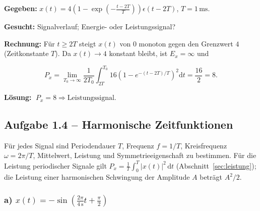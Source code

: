 \begin{beispiel}

\textbf{Gegeben:} $x(t) = 4\left(1 - \exp\!\left(-\frac{t-2T}{T}\right)\right)
\epsilon(t-2T)$, $T = 1\,\mathrm{ms}$.

\textbf{Gesucht:} Signalverlauf; Energie- oder Leistungssignal?

\textbf{Rechnung:} Für $t \geq 2T$ steigt $x(t)$ von $0$ monoton gegen den
Grenzwert $4$ (Zeitkonstante $T$). Da $x(t) \to 4$ konstant bleibt, ist
$E_x = \infty$ und

$$
P_x = \lim_{T_0 \to \infty} \frac{1}{2T_0}\int_{2T}^{T_0}
      16\left(1 - e^{-(t-2T)/T}\right)^2 \mathrm{d}t = \frac{16}{2} = 8.
$$

\begin{center}
\end{center}

\textbf{Lösung:} $\boxed{\;P_x = 8 \Rightarrow \text{Leistungssignal.}\;}$

\end{beispiel}

\subsection*{Aufgabe 1.4 – Harmonische Zeitfunktionen}

Für jedes Signal sind Periodendauer $T$, Frequenz $f = 1/T$, Kreisfrequenz
$\omega = 2\pi/T$, Mittelwert, Leistung und Symmetrieeigenschaft zu bestimmen.
Für die Leistung periodischer Signale gilt
$P_x = \frac{1}{T}\int_0^T |x(t)|^2\,\mathrm{d}t$
(Abschnitt~\ref{sec:leistung}); die Leistung einer harmonischen Schwingung der
Amplitude $A$ beträgt $A^2/2$.

\subsubsection*{a) $x(t) = -\sin\!\left(\frac{2\pi}{4\,\mathrm{s}}t + \frac{\pi}{2}\right)$}

